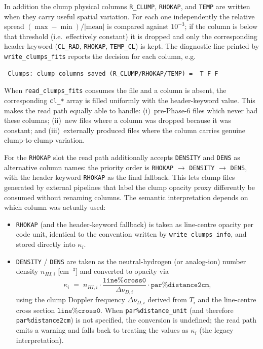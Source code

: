 \documentclass[english,a4paper]{my_memo}
\begin{document}
In addition the clump physical columns \texttt{R\_CLUMP},
\texttt{RHOKAP}, and \texttt{TEMP} are written when they carry useful
spatial variation.  For each one independently the relative spread
$(\max-\min)/|\mathrm{mean}|$ is compared against $10^{-3}$; if the
column is below that threshold (i.e.\ effectively constant) it is dropped
and only the corresponding header keyword (\texttt{CL\_RAD},
\texttt{RHOKAP}, \texttt{TEMP\_CL}) is kept.  The diagnostic line printed
by \texttt{write\_clumps\_fits} reports the decision for each column, e.g.

\begin{lstlisting}
 Clumps: clump columns saved (R_CLUMP/RHOKAP/TEMP) =  T F F
\end{lstlisting}

When \texttt{read\_clumps\_fits} consumes the file and a column is
absent, the corresponding \texttt{cl\_*} array is filled uniformly with
the header-keyword value.  This makes the read path equally able to
handle:
(i)~pre-Phase-6 files which never had these columns;
(ii)~new files where a column was dropped because it was constant; and
(iii)~externally produced files where the column carries genuine
clump-to-clump variation.

For the \texttt{RHOKAP} slot the read path additionally accepts
\texttt{DENSITY} and \texttt{DENS} as alternative column names: the
priority order is
\texttt{RHOKAP} $\to$ \texttt{DENSITY} $\to$ \texttt{DENS}, with the
header keyword \texttt{RHOKAP} as the final fallback.  This lets clump
files generated by external pipelines that label the clump opacity
proxy differently be consumed without renaming columns.  The semantic
interpretation depends on which column was actually used:
\begin{itemize}
\item \texttt{RHOKAP} (and the header-keyword fallback) is taken as
      line-centre opacity per code unit, identical to the convention
      written by \texttt{write\_clumps\_info}, and stored directly into
      $\kappa_i$.
\item \texttt{DENSITY} / \texttt{DENS} are taken as the neutral-hydrogen
      (or analog-ion) number density $n_{HI,i}$ [cm$^{-3}$] and
      converted to opacity via
      \begin{equation}
        \kappa_i \;=\; n_{HI,i} \cdot \frac{\texttt{line\%cross0}}{\Delta\nu_{D,i}}
                                \cdot \texttt{par\%distance2cm},
      \label{eq:nH_to_rhokap}
      \end{equation}
      using the clump Doppler frequency $\Delta\nu_{D,i}$ derived
      from $T_i$ and the line-centre cross section
      $\texttt{line\%cross0}$.  When \texttt{par\%distance\_unit} (and
      therefore \texttt{par\%distance2cm}) is not specified, the
      conversion is undefined; the read path emits a warning and falls
      back to treating the values as $\kappa_i$ (the legacy
      interpretation).
\end{itemize}
\end{document}
